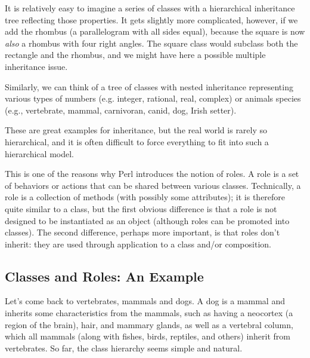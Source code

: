 It is relatively easy to imagine a series of classes with a 
hierarchical inheritance tree reflecting those properties. It 
gets slightly more complicated, however, if we add the rhombus 
(a parallelogram with all sides equal), because the square is 
now \emph{also} a rhombus with four right angles. 
The square class would subclass both the rectangle and the 
rhombus, and we might have here a possible multiple inheritance 
issue.

   
  
 
Similarly, we can think of a tree of classes with nested 
inheritance representing various types of numbers (e.g. integer, 
rational, real, complex) or animals species (e.g., vertebrate, 
mammal, carnivoran, canid, dog, Irish setter).

These are great examples for inheritance, but the real world is 
rarely so hierarchical, and it is often difficult to force 
everything to fit into such a hierarchical model.

This is one of the reasons why Perl introduces the notion of 
roles. A role is a set of behaviors or actions that can be shared 
between various classes. Technically, a role is a collection 
of methods (with possibly some attributes); it is therefore 
quite similar to a class, but the first obvious difference 
is that a role is not designed to be instantiated as an object 
(although roles can be promoted into classes). The 
second difference, perhaps more important, is that roles 
don't inherit: they are used through application to a class 
and/or composition.

\subsection{Classes and Roles: An Example}

  
Let's come back to vertebrates, mammals and dogs. A dog is 
a mammal and inherits some characteristics from the mammals, 
such as having a neocortex (a region of the brain), hair, 
and mammary glands, as well as a vertebral column, which 
all mammals (along with fishes, birds, reptiles, and others) 
inherit from vertebrates. So far, the class hierarchy seems 
simple and natural.

